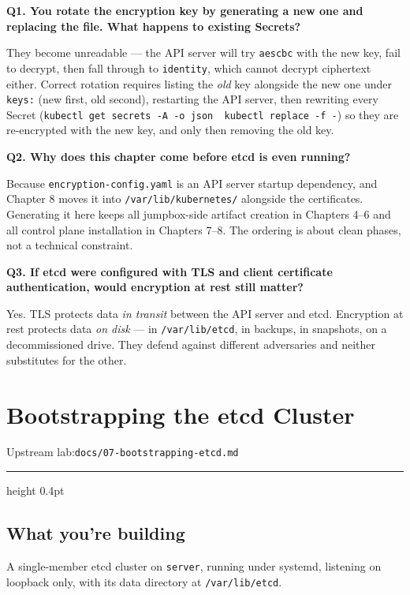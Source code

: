 \documentclass[11pt,oneside]{report}
\newcommand{\upstreamlab}[1]{%
  {\sffamily\footnotesize\color{steel}Upstream lab:\quad\texttt{#1}}\par\vspace{2pt}%
  {\color{rule}\hrule height 0.4pt}\vspace{8pt}}
\begin{document}
\textbf{Q1. You
rotate the
encryption key by
generating a new one
and replacing the
file. What happens
to existing
Secrets?}

They become
unreadable --- the
API server will try
\texttt{aescbc} with
the new key, fail to
decrypt, then fall
through to
\texttt{identity},
which cannot decrypt
ciphertext either.
Correct rotation
requires listing the
\emph{old} key
alongside the new
one under
\texttt{keys:} (new
first, old second),
restarting the API
server, then
rewriting every
Secret
(\texttt{kubectl\ get\ secrets\ -}\allowbreak{}\texttt{A\ -}\allowbreak{}\texttt{o\ json\ \textbar{}\ kubectl\ replace\ -}\allowbreak{}\texttt{f\ -}\allowbreak{})
so they are
re-encrypted with
the new key, and
only then removing
the old key.

\textbf{Q2. Why does
this chapter come
before etcd is even
running?}

Because
\texttt{encryption-}\allowbreak{}\texttt{config.}\allowbreak{}\texttt{yaml}
is an API server
startup dependency,
and Chapter 8 moves
it into
\texttt{/}\allowbreak{}\texttt{var/}\allowbreak{}\texttt{lib/}\allowbreak{}\texttt{kubernetes/}\allowbreak{}
alongside the
certificates.
Generating it here
keeps all
jumpbox-side
artifact creation in
Chapters 4--6 and
all control plane
installation in
Chapters 7--8. The
ordering is about
clean phases, not a
technical
constraint.

\textbf{Q3. If etcd
were configured with
TLS and client
certificate
authentication,
would encryption at
rest still matter?}

Yes. TLS protects
data \emph{in
transit} between the
API server and etcd.
Encryption at rest
protects data
\emph{on disk} ---
in
\texttt{/var/lib/etcd},
in backups, in
snapshots, on a
decommissioned
drive. They defend
against different
adversaries and
neither substitutes
for the other.

\hypertarget{chap-7}{%
\chapter{Bootstrapping
the etcd
Cluster}\label{chap-7}}

\upstreamlab{docs/07-bootstrapping-etcd.md}

\hypertarget{what-youre-building-7}{%
\section{What you're
building}\label{what-youre-building-7}}

A single-member etcd
cluster on
\texttt{server},
running under
systemd, listening
on loopback only,
with its data
directory at
\texttt{/var/lib/etcd}.
\end{document}
